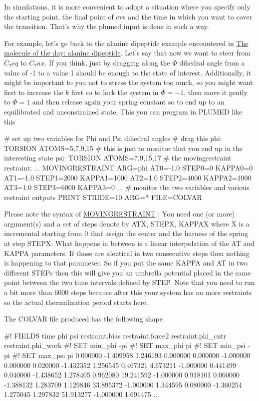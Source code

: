In simulations, it is more convenient to adopt a situation where you specify only the starting point, the final point of cvs and the time in which you want to cover the transition. That's why the plumed input is done in such a way.

For example, let's go back to the alanine dipeptide example encountered in \hyperlink{belfast-2_belfast-2-ala}{The molecule of the day\+: alanine dipeptide}. Let's say that now we want to steer from $ C_7eq $ to $ C_7ax $. If you think, just by dragging along the $ \Phi $ dihedral angle from a value of -\/1 to a value 1 should be enough to the state of interest. Additionally, it might be important to you not to stress the system too much, so you might want first to increase the $ k $ first so to lock the system in $ \Phi =-1 $, then move it gently to $ \Phi =1 $ and then release again your spring constant so to end up to an equilibrated and unconstrained state. This you can program in P\+L\+U\+M\+E\+D like this \begin{DoxyVerb}# set up two variables for Phi and Psi dihedral angles
# drag this
phi: TORSION ATOMS=5,7,9,15
# this is just to monitor that you end up in the interesting state
psi: TORSION ATOMS=7,9,15,17
# the movingrestraint
restraint: ...
        MOVINGRESTRAINT
        ARG=phi
        AT0=-1.0 STEP0=0      KAPPA0=0
        AT1=-1.0 STEP1=2000   KAPPA1=1000
        AT2=1.0  STEP2=4000   KAPPA2=1000
        AT3=1.0  STEP3=6000   KAPPA3=0
...
# monitor the two variables and various restraint outputs
PRINT STRIDE=10 ARG=* FILE=COLVAR
\end{DoxyVerb}


Please note the syntax of \hyperlink{MOVINGRESTRAINT}{M\+O\+V\+I\+N\+G\+R\+E\+S\+T\+R\+A\+I\+N\+T} \+: You need one (or more) argument(s) and a set of steps denote by A\+T\+X, S\+T\+E\+P\+X, K\+A\+P\+P\+A\+X where X is a incremental starting from 0 that assign the center and the harness of the spring at step S\+T\+E\+P\+X. What happens in between is a linear interpolation of the A\+T and K\+A\+P\+P\+A parameters. If those are identical in two consecutive steps then nothing is happening to that parameter. So if you put the same K\+A\+P\+P\+A and A\+T in two different S\+T\+E\+Ps then this will give you an umbrella potential placed in the same point between the two time intervals defined by S\+T\+E\+P. Note that you need to run a bit more than 6000 steps because after this your system has no more restraints so the actual thermalization period starts here.

The C\+O\+L\+V\+A\+R file produced has the following shape \begin{DoxyVerb}#! FIELDS time phi psi restraint.bias restraint.force2 restraint.phi_cntr restraint.phi_work
#! SET min_phi -pi
#! SET max_phi pi
#! SET min_psi -pi
#! SET max_psi pi
 0.000000 -1.409958 1.246193 0.000000 0.000000 -1.000000 0.000000
 0.020000 -1.432352 1.256545 0.467321 4.673211 -1.000000 0.441499
 0.040000 -1.438652 1.278405 0.962080 19.241592 -1.000000 0.918101
 0.060000 -1.388132 1.283709 1.129846 33.895372 -1.000000 1.344595
 0.080000 -1.360254 1.275045 1.297832 51.913277 -1.000000 1.691475
 ...
\end{DoxyVerb}


